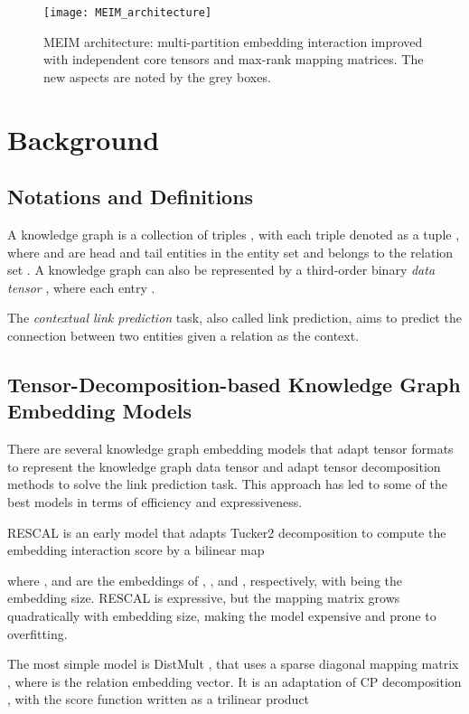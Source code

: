 \documentclass{article}
\theoremstyle{plain}
\theoremstyle{remark}
\begin{document}
\begin{figure*}[ht]
	\centering
	\texttt{[image: MEIM\_architecture]}
	\caption{MEIM architecture: multi-partition embedding interaction improved with independent core tensors and max-rank mapping matrices. The new aspects are noted by the grey boxes.}
	\label{fig:meim_architecture}
\end{figure*}


\section{Background} \label{sect:background_mei}


\subsection{Notations and Definitions} \label{sect:notation} 

A knowledge graph is a collection of triples , with each triple denoted as a tuple , where  and  are head and tail entities in the entity set  and  belongs to the relation set . A knowledge graph can also be represented by a third-order binary \textit{data tensor} , where each entry . 

The \textit{contextual link prediction} task, also called link prediction, aims to predict the connection between two entities given a relation as the context. 

\subsection{Tensor-Decomposition-based Knowledge Graph Embedding Models}
There are several knowledge graph embedding models that adapt tensor formats to represent the knowledge graph data tensor and adapt tensor decomposition methods to solve the link prediction task. This approach has led to some of the best models in terms of efficiency and expressiveness.

RESCAL \cite{nickel_threewaymodelcollective_2011} is an early model that adapts Tucker2 decomposition to compute the embedding interaction score by a bilinear map 

where , and  are the embeddings of , , and , respectively, with  being the embedding size. RESCAL is expressive, but the mapping matrix  grows quadratically with embedding size, making the model expensive and prone to overfitting. 

The most simple model is DistMult \cite{yang_embeddingentitiesrelations_2015}, that uses a sparse diagonal mapping matrix , where  is the relation embedding vector. It is an adaptation of CP decomposition \cite{kolda_tensordecompositionsapplications_2009}, with the score function written as a trilinear product
\end{document}
